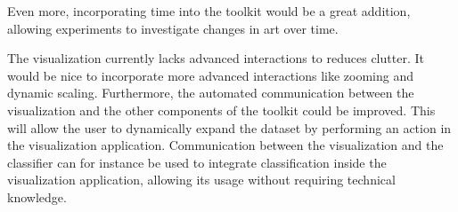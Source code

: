 Even more, incorporating time into the toolkit would be a great addition, allowing experiments to investigate changes in art over time.

The visualization currently lacks advanced interactions to reduces clutter.
It would be nice to incorporate more advanced interactions like zooming and dynamic scaling.
Furthermore, the automated communication between the visualization and the other components of the toolkit could be improved. This will allow the user to dynamically expand the dataset by performing an action in the visualization application. 
Communication between the visualization and the classifier can for instance be used to integrate classification inside the visualization application, allowing its usage without requiring technical knowledge.


